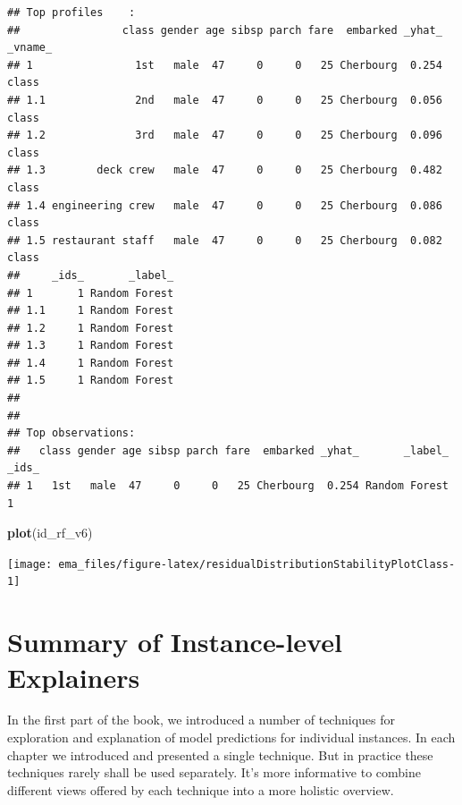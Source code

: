 \documentclass[]{krantz}
\newenvironment{Shaded}{\begin{snugshade}}{\end{snugshade}}
\newcommand{\KeywordTok}[1]{\textcolor[rgb]{0.13,0.29,0.53}{\textbf{#1}}}
\newcommand{\NormalTok}[1]{#1}
\begin{document}
\begin{verbatim}
## Top profiles    : 
##                class gender age sibsp parch fare  embarked _yhat_ _vname_
## 1                1st   male  47     0     0   25 Cherbourg  0.254   class
## 1.1              2nd   male  47     0     0   25 Cherbourg  0.056   class
## 1.2              3rd   male  47     0     0   25 Cherbourg  0.096   class
## 1.3        deck crew   male  47     0     0   25 Cherbourg  0.482   class
## 1.4 engineering crew   male  47     0     0   25 Cherbourg  0.086   class
## 1.5 restaurant staff   male  47     0     0   25 Cherbourg  0.082   class
##     _ids_       _label_
## 1       1 Random Forest
## 1.1     1 Random Forest
## 1.2     1 Random Forest
## 1.3     1 Random Forest
## 1.4     1 Random Forest
## 1.5     1 Random Forest
## 
## 
## Top observations:
##   class gender age sibsp parch fare  embarked _yhat_       _label_ _ids_
## 1   1st   male  47     0     0   25 Cherbourg  0.254 Random Forest     1
\end{verbatim}

\begin{Shaded}
\begin{Highlighting}[]
\KeywordTok{plot}\NormalTok{(id_rf_v6)}
\end{Highlighting}
\end{Shaded}

\begin{center}\texttt{[image: ema\_files/figure-latex/residualDistributionStabilityPlotClass-1]} \end{center}

\hypertarget{summaryInstanceLevel}{%
\chapter{Summary of Instance-level Explainers}\label{summaryInstanceLevel}}

In the first part of the book, we introduced a number of techniques for exploration and explanation of model predictions for individual instances.
In each chapter we introduced and presented a single technique.
But in practice these techniques rarely shall be used separately. It's more informative to combine different views offered by each technique into a more holistic overview.
\end{document}
